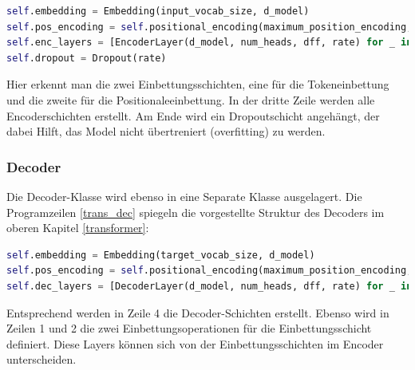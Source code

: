\begin{lstlisting}[language=Python, caption={Encoder}]
self.embedding = Embedding(input_vocab_size, d_model)
self.pos_encoding = self.positional_encoding(maximum_position_encoding, self.d_model)
self.enc_layers = [EncoderLayer(d_model, num_heads, dff, rate) for _ in range(self.num_layers)]
self.dropout = Dropout(rate)
\end{lstlisting}

Hier erkennt man die zwei Einbettungsschichten, eine für die Tokeneinbettung und die zweite für die Positionaleeinbettung. In der dritte Zeile werden alle Encoderschichten erstellt. Am Ende wird ein Dropoutschicht angehängt, der dabei Hilft, das Model nicht übertreniert (overfitting) zu werden.

\subsubsection{Decoder}

Die Decoder-Klasse wird ebenso in eine Separate Klasse ausgelagert. Die Programzeilen \ref{trans_dec} spiegeln die vorgestellte Struktur des Decoders im oberen Kapitel \ref{transformer}: 

\begin{lstlisting}[language=Python, caption={Decoder Implementation}, label=trans_dec]
self.embedding = Embedding(target_vocab_size, d_model)
self.pos_encoding = self.positional_encoding(maximum_position_encoding, d_model)
self.dec_layers = [DecoderLayer(d_model, num_heads, dff, rate) for _ in range(num_layers)]
\end{lstlisting}

Entsprechend werden in Zeile 4 die Decoder-Schichten erstellt. Ebenso wird in Zeilen 1 und 2 die zwei Einbettungsoperationen für die Einbettungsschicht definiert. Diese Layers können sich von der Einbettungsschichten im Encoder unterscheiden.

